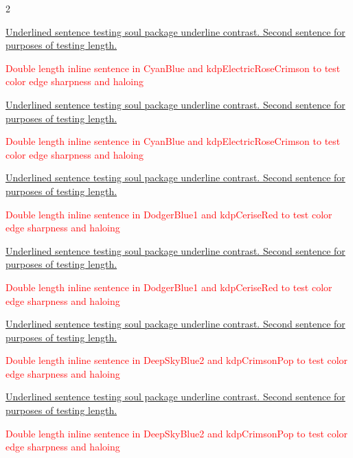 \begin{multicols}{2}
\par\noindent\ul{Underlined sentence testing soul package underline contrast. Second sentence for purposes of testing length.}
\par\noindent\textcolor{Red}{Double length inline sentence in CyanBlue and kdpElectricRoseCrimson to test color edge sharpness and haloing}
\clearpage
{}
\par\noindent\ul{Underlined sentence testing soul package underline contrast. Second sentence for purposes of testing length.}
\par\noindent\textcolor{Red}{Double length inline sentence in CyanBlue and kdpElectricRoseCrimson to test color edge sharpness and haloing}
\clearpage
{}
\par\noindent\ul{Underlined sentence testing soul package underline contrast. Second sentence for purposes of testing length.}
\par\noindent\textcolor{Red}{Double length inline sentence in DodgerBlue1 and kdpCeriseRed to test color edge sharpness and haloing}
\clearpage
{}
\par\noindent\ul{Underlined sentence testing soul package underline contrast. Second sentence for purposes of testing length.}
\par\noindent\textcolor{Red}{Double length inline sentence in DodgerBlue1 and kdpCeriseRed to test color edge sharpness and haloing}
\clearpage
{}
\par\noindent\ul{Underlined sentence testing soul package underline contrast. Second sentence for purposes of testing length.}
\par\noindent\textcolor{Red}{Double length inline sentence in DeepSkyBlue2 and kdpCrimsonPop to test color edge sharpness and haloing}
\clearpage
{}
\par\noindent\ul{Underlined sentence testing soul package underline contrast. Second sentence for purposes of testing length.}
\par\noindent\textcolor{Red}{Double length inline sentence in DeepSkyBlue2 and kdpCrimsonPop to test color edge sharpness and haloing}

\end{multicols}
